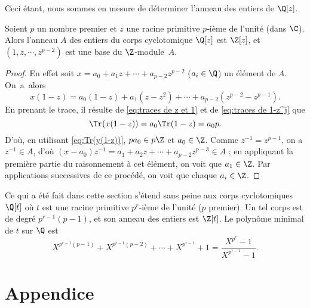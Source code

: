 \documentclass[11pt, %
  title in boldface,
  theorem in new line,
  theorem numbering = section,
  number theorems separately,
  simple name,
]{beaulivre}
\begin{document}
    Ceci étant, nous sommes en mesure de déterminer l'anneau des entiers de \( \Q[z] \).

    \begin{theorem}\label{thm:base d'un corps cyclotomique}
        Soient \( p \) un nombre premier et \( z \) une racine primitive \( p \)‑ième de l'unité (dans \( \C \)). Alors l'anneau \( A \) des entiers du corps cyclotomique \( \Q[z] \) est \( \Z[z] \), et \( (1,z,\cdots,z^{p-2}) \) est une base du \( \Z \)‑module~\( A \).
    \end{theorem}
    \begin{proof}
        En effet soit \( x = a_0 + a_1 z + \cdots + a_{p-2}z^{p-2} \) (\( a_i \in \Q \)) un élément de \( A \). On~a~alors
        \[
            x(1-z) = a_0(1-z) + a_1(z-z^2) + \cdots + a_{p-2}(z^{p-2}-z^{p-1}).
        \]
        En prenant le trace, il résulte de \eqref{eq:traces de z et 1} et de \eqref{eq:traces de 1-z^j} que
        \[
            \Tr(x(1-z)) = a_0 \Tr(1-z) = a_0 p.
        \]
        D'où, en utilisant \eqref{eq:Tr(y(1-z))}, \( p a_0 \in p\Z \) et \( a_0 \in \Z \). Comme \( z^{-1} = z^{p-1} \), on a \( z^{-1} \in A \), d'où \( (x-a_0)z^{-1} = a_1 + a_2 z + \cdots + a_{p-2}z^{p-3} \in A \) ; en appliquant la première partie du raisonnement à cet élément, on voit que \( a_1 \in \Z \). Par applications successives de ce procédé, on voit que chaque \( a_i \in \Z \).
    \end{proof}

    \begin{remark}
        Ce qui a été fait dans cette section s'étend sans peine aux corps cyclotomiques \( \Q[t] \) où \( t \) est une racine primitive \( p^r \)‑ième de l'unité (\( p \) premier). Un tel corps est de degré \( p^{r-1}(p-1) \), et son anneau des entiers est \( \Z[t] \). Le polynôme minimal de \( t \) sur \( \Q \) est
        \[
            X^{p^{r-1}(p-1)} + X^{p^{r-1}(p-2)} + \cdots + X^{p^{r-1}} + 1 = \frac{X^{p^r} - 1}{X^{p^{r-1}} - 1}.
        \]
    \end{remark}

\cleardoublepage
{}
{}
\section*{Appendice}
\end{document}
